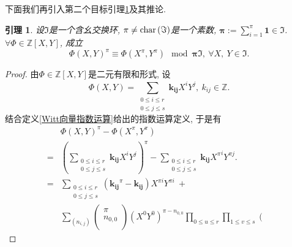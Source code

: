 \documentclass[UTF8, twoside]{ctexart}
\theoremstyle{nonumberplain}
\newtheorem{proof}{\heiti 证明}  %
\theoremstyle{nonumberplain}
\theoremstyle{plain}
\newtheorem{yinli4}[dingyi4]{引理}
\begin{document}
	下面我们再引入第二个目标引理\ref{封闭性第二个引理}及其推论.
	\begin{yinli4} \label{封闭性第二个引理}
		设$\Im $是一个含幺交换环, $\pi \ne \textup{char}\left( \Im  \right)$是一个素数,
		$\bm{\pi} :=\sum_{i=1}^{\pi }{\bm{1}\in \Im }$.
		 $\forall \Phi \in \mathbb{Z}\left[ X,Y \right]$, 成立
		\[
		\Phi {{\left( X,Y \right)}^{\pi }}\equiv \Phi \left( {{X}^{\pi }},{{Y}^{\pi }} \right)
		\ \bmod \bm{\pi} \Im,\ 
		\forall X,\ Y\in \Im .
		\]
	\end{yinli4}
	\begin{proof}
		由$\Phi \in \mathbb{Z}\left[ X,Y \right]$是二元有限和形式, 设
		\[
			\Phi \left( X,Y \right)=\sum\limits_{\begin{smallmatrix} 
					0\le i\le r \\ 
					0\le j\le s 
			\end{smallmatrix}}^{{}}{\bm{{k}_{ij}}{{X}^{i}}{{Y}^{j}}},
		\ {{k}_{ij}}\in \mathbb{Z}.
		\]
		结合定义\ref{Witt向量指数运算}给出的指数运算定义, 于是有
		\begin{align*}
			& \Phi {{\left( X,Y \right)}^{\pi }}-\Phi \left( {{X}^{\pi }},{{Y}^{\pi }} \right) \\ 
			=&{{\left( \sum\limits_{\begin{smallmatrix} 
							0\le i\le r \\ 
							0\le j\le s 
					\end{smallmatrix}}^{{}}{\bm{{k}_{ij}}{{X}^{i}}{{Y}^{j}}} \right)}^{\pi }}-\sum\limits_{\begin{smallmatrix} 
					0\le i\le r \\ 
					0\le j\le s 
			\end{smallmatrix}}^{{}}{\bm{{k}_{ij}}{{X}^{\pi }}^{i}{{Y}^{\pi j}}}. \\ 
			=&\sum\limits_{\begin{smallmatrix} 
					0\le i\le r \\ 
					0\le j\le s 
			\end{smallmatrix}}^{{}}{\left( \bm{{k}_{ij}}^{\pi }-\bm{{k}_{ij}} \right){{X}^{\pi i}}{{Y}^{\pi i}}}\ +\\
		&\sum\limits_{\left( {{n}_{i,j}} \right)}^{{}}{\left( \begin{matrix}
					\pi   \\
					{{n}_{0,0}}  \\
				\end{matrix} \right){{\left( {{X}^{0}}{{Y}^{0}} \right)}^{\pi -{{n}_{0,0}}}}\prod\limits_{0\le u\le r}^{{}}{\prod\limits_{1\le v\le s}^{{}}{\left( \begin{matrix}

\end{matrix}}}}
\end{align*}
\end{proof}
\end{document}
